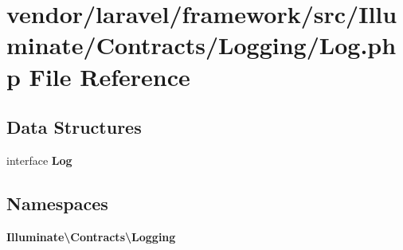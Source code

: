 \section{vendor/laravel/framework/src/\+Illuminate/\+Contracts/\+Logging/\+Log.php File Reference}
\label{_contracts_2_logging_2_log_8php}
\subsection*{Data Structures}
\begin{DoxyCompactItemize}
\item 
interface {\bf Log}
\end{DoxyCompactItemize}
\subsection*{Namespaces}
\begin{DoxyCompactItemize}
\item 
 {\bf Illuminate\textbackslash{}\+Contracts\textbackslash{}\+Logging}
\end{DoxyCompactItemize}
